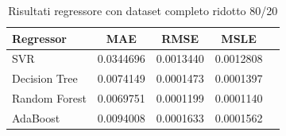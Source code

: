 \begin{table}[H]
    \centering
    \begin{tabular}{|>{\centering\arraybackslash}m{5cm}|c|c|c|c|}
        \hline
        \textbf{Regressor} & \textbf{MAE} & \textbf{RMSE} & \textbf{MSLE} \\ [10pt]
        \hline
        SVR & 0.0344696 & 0.0013440 & 0.0012808 \\ [10pt]
        \hline
        Decision Tree & 0.0074149 & 0.0001473 & 0.0001397 \\ [10pt]
        \hline
        Random Forest & 0.0069751 & 0.0001199 & 0.0001140 \\ [10pt]
        \hline
        AdaBoost & 0.0094008 & 0.0001633 & 0.0001562 \\ [10pt]
        \hline
    \end{tabular}
    \caption{Risultati regressore con dataset completo ridotto 80/20}
    \label{tab:results}
\end{table}

